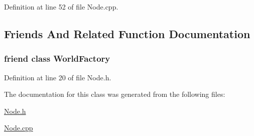 Definition at line 52 of file Node.\+cpp.



\subsection{Friends And Related Function Documentation}
\hypertarget{classjli_1_1_node_acb96ebb09abe8f2a37a915a842babfac}{
\subsubsection[{World\+Factory}]{\setlength{\rightskip}{0pt plus 5cm}friend class {\bf World\+Factory}\hspace{0.3cm}{\ttfamily [friend]}}}\label{classjli_1_1_node_acb96ebb09abe8f2a37a915a842babfac}


Definition at line 20 of file Node.\+h.



The documentation for this class was generated from the following files\+:\begin{DoxyCompactItemize}
\item 
\hyperlink{_node_8h}{Node.\+h}\item 
\hyperlink{_node_8cpp}{Node.\+cpp}\end{DoxyCompactItemize}
